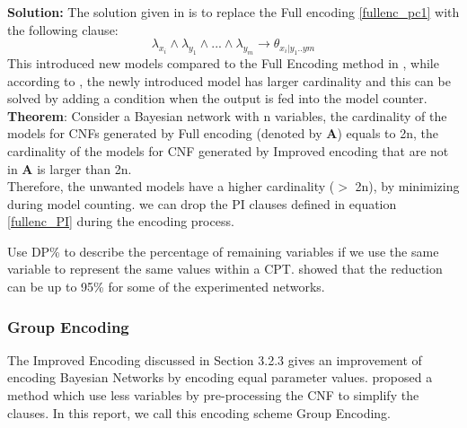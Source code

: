 \begin{itemize}
        \textbf{Solution:} The solution given in \cite{enc2} is to replace the Full encoding \ref{fullenc_pc1} with the following clause:
        \begin{equation}\label{improvedenc_pc}
            \lambda_{x_{i}} \wedge \lambda_{y_{1}} \wedge... \wedge \lambda_{y_{m}} \rightarrow \theta_{x_{i}|y_{1}..y{m}}
        \end{equation}
        This introduced new models compared to the Full Encoding method in \cite{enc1}, while according to \cite{enc2}, the newly introduced model has larger cardinality and this can be solved by adding a condition when the output is fed into the model counter.\\
        
        \noindent\textbf{Theorem}\cite{enc2}: Consider a Bayesian network with n variables, the cardinality of the models for CNFs  generated by Full encoding (denoted by \textbf{A}) equals to 2n, the cardinality of the models for CNF generated by Improved encoding that are not in \textbf{A} is larger than 2n.\\
        Therefore, the unwanted models have a higher cardinality ($>$ 2n), by minimizing during model counting. we can drop the PI clauses defined in equation \ref{fullenc_PI} during the encoding process.
        \end{itemize}
        
        \noindent Use DP\%  to describe the percentage of remaining variables if we use the same variable to represent the same values within a CPT. \cite{2008-literature-review} showed that the reduction can be up to 95\% for some of the experimented networks.\\
        
        \subsubsection{Group Encoding}
    
        The Improved Encoding discussed in Section 3.2.3 gives an improvement of encoding Bayesian Networks by encoding equal parameter values. \cite{2006-enc3} proposed a method which use less variables by pre-processing the CNF to simplify the clauses. In this report, we call this encoding scheme Group Encoding.\\
        

